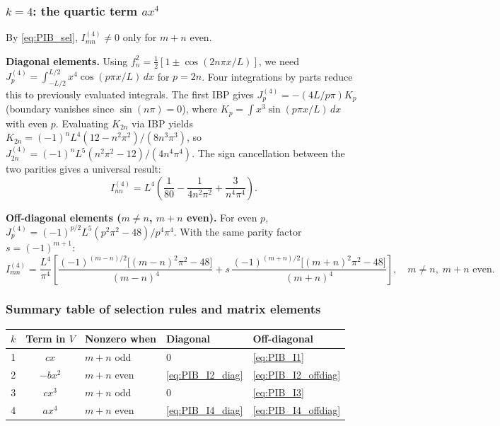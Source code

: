 \subsubsection{$k = 4$: the quartic term $ax^4$}\label{sec:PIB_k4}

By \cref{eq:PIB_sel}, $I_{mn}^{(4)} \neq 0$ only for $m+n$ even.

\textbf{Diagonal elements.}
Using $f_n^2 = \frac{1}{2}[1\pm\cos(2n\pi x/L)]$, we need
$J_p^{(4)} = \int_{-L/2}^{L/2}x^4\cos(p\pi x/L)\,dx$ for $p = 2n$.
Four integrations by parts reduce this to previously evaluated integrals.
The first IBP gives $J_p^{(4)} = -(4L/p\pi)K_p$ (boundary vanishes since
$\sin(n\pi) = 0$), where $K_p = \int x^3\sin(p\pi x/L)\,dx$ with even $p$.
Evaluating $K_{2n}$ via IBP yields $K_{2n} = (-1)^n L^4(12-n^2\pi^2)/(8n^3\pi^3)$,
so $J_{2n}^{(4)} = (-1)^n L^5(n^2\pi^2-12)/(4n^4\pi^4)$.
The sign cancellation between the two parities gives a universal result:
\begin{equation}\label{eq:PIB_I4_diag}
  \boxed{I_{nn}^{(4)} = L^4\!\left(\frac{1}{80} - \frac{1}{4n^2\pi^2}
    + \frac{3}{n^4\pi^4}\right).}
\end{equation}

\textbf{Off-diagonal elements ($m \neq n$, $m+n$ even).}
For even $p$, $J_p^{(4)} = (-1)^{p/2}L^5(p^2\pi^2-48)/p^4\pi^4$.
With the same parity factor $s = (-1)^{m+1}$:
\begin{equation}\label{eq:PIB_I4_offdiag}
  \boxed{I_{mn}^{(4)} = \frac{L^4}{\pi^4}\!\left[
    \frac{(-1)^{(m-n)/2}\bigl[(m-n)^2\pi^2-48\bigr]}{(m-n)^4}
    +s\,\frac{(-1)^{(m+n)/2}\bigl[(m+n)^2\pi^2-48\bigr]}{(m+n)^4}
  \right],\quad m\neq n,\;m+n\text{ even.}}
\end{equation}

\subsubsection{Summary table of selection rules and matrix elements}

\begin{center}
\renewcommand{\arraystretch}{1.5}
\begin{tabular}{cclll}
  \toprule
  $k$ & Term in $V$ & Nonzero when & Diagonal & Off-diagonal \\
  \midrule
  1 & $cx$ & $m+n$ odd & $0$ & \cref{eq:PIB_I1} \\
  2 & $-bx^2$ & $m+n$ even & \cref{eq:PIB_I2_diag} & \cref{eq:PIB_I2_offdiag} \\
  3 & $cx^3$ & $m+n$ odd & $0$ & \cref{eq:PIB_I3} \\
  4 & $ax^4$ & $m+n$ even & \cref{eq:PIB_I4_diag} & \cref{eq:PIB_I4_offdiag} \\
  \bottomrule
\end{tabular}
\end{center}

